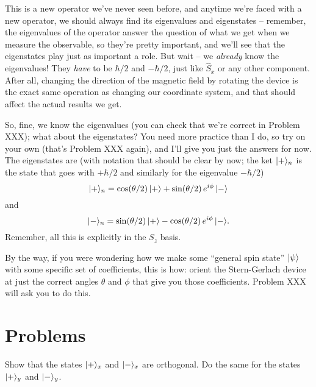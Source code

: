 This is a new operator we've never seen before, and anytime we're faced with a new operator, we should always find its eigenvalues and eigenstates -- remember, the eigenvalues of the operator answer the question of what we get when we measure the observable, so they're pretty important, and we'll see that the eigenstates play just as important a role.  But wait -- we \emph{already} know the eigenvalues!  They \emph{have} to be $\hbar/2$ and $-\hbar/2$, just like $\hat{S}_x$ or any other component.  After all, changing the direction of the magnetic field by rotating the device is the exact same operation as changing our coordinate system, and that should affect the actual results we get.

So, fine, we know the eigenvalues (you can check that we're correct in Problem XXX); what about the eigenstates?  You need more practice than I do, so try on your own (that's Problem XXX again), and I'll give you just the answers for now.  The eigenstates are (with notation that should be clear by now; the ket $| + \rangle_n$ is the state that goes with $+\hbar/2$ and similarly for the eigenvalue $-\hbar/2$)
\begin{equation}
| + \rangle_n = \cos (\theta/2) \, | + \rangle + \sin (\theta/2) \, e^{i\phi} \, | - \rangle
\end{equation}
and
\begin{equation}
| - \rangle_n = \sin (\theta/2) \, | + \rangle - \cos (\theta/2) \, e^{i\phi} \, | - \rangle.
\end{equation}
Remember, all this is explicitly in the $S_z$ basis.

By the way, if you were wondering how we make some ``general spin state'' $| \psi \rangle$ with some specific set of coefficients, this is how:  orient the Stern-Gerlach device at just the correct angles $\theta$ and $\phi$ that give you those coefficients.  Problem XXX will ask you to do this.

\section*{Problems}
%

\begin{problem}[Orthogonality]
Show that the states $| + \rangle_x$ and $| - \rangle_x$ are orthogonal.  Do the same for the states $| + \rangle_y$ and $| - \rangle_y$. 
\end{problem}



